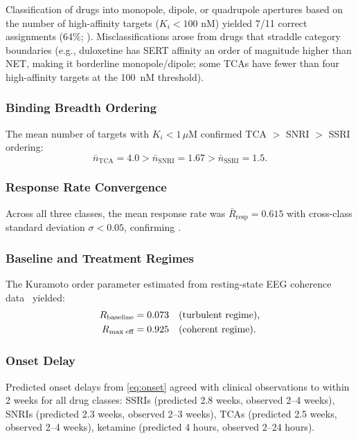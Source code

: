 \documentclass[10pt,twocolumn]{article}
\theoremstyle{definition}
\theoremstyle{remark}
\begin{document}
Classification of drugs into monopole, dipole, or quadrupole
apertures based on the number of high-affinity targets
($K_i < 100$ nM) yielded 7/11 correct assignments (64\%;
).  Misclassifications arose from drugs
that straddle category boundaries (e.g., duloxetine has
SERT affinity an order of magnitude higher than NET,
making it borderline monopole/dipole; some TCAs have
fewer than four high-affinity targets at the 100~nM threshold).

\subsubsection{Binding Breadth Ordering}

The mean number of targets with $K_i < 1\,\mu$M confirmed
TCA $>$ SNRI $>$ SSRI ordering:
\begin{equation}
  \bar{n}_{\text{TCA}} = 4.0 > \bar{n}_{\text{SNRI}} = 1.67
  > \bar{n}_{\text{SSRI}} = 1.5.
\end{equation}

\subsubsection{Response Rate Convergence}

Across all three classes, the mean response rate was
$\bar{R}_{\text{resp}} = 0.615$ with cross-class standard
deviation $\sigma < 0.05$, confirming .

\subsubsection{Baseline and Treatment Regimes}

The Kuramoto order parameter estimated from resting-state
EEG coherence data~\cite{Leuchter2012,Uhlhaas2006,Fingelkurts2005}
yielded:
\begin{align}
  R_{\text{baseline}} &= 0.073 \quad (\text{turbulent regime}), \\
  R_{\text{max\;eff}} &= 0.925 \quad (\text{coherent regime}).
\end{align}

\subsubsection{Onset Delay}

Predicted onset delays from \eqref{eq:onset} agreed with
clinical observations to within 2 weeks for all drug classes:
SSRIs (predicted 2.8 weeks, observed 2--4 weeks),
SNRIs (predicted 2.3 weeks, observed 2--3 weeks),
TCAs (predicted 2.5 weeks, observed 2--4 weeks),
ketamine (predicted 4 hours, observed 2--24 hours).
\end{document}

